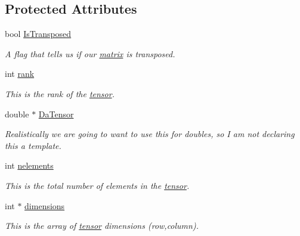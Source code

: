 \subsection*{Protected Attributes}
\begin{DoxyCompactItemize}
\item 
bool \hyperlink{classJKBuilder_1_1matrix_a77fa48e57c519482de2ec7ec182b16ef}{IsTransposed}
\begin{DoxyCompactList}\small\item\em A flag that tells us if our \hyperlink{classJKBuilder_1_1matrix}{matrix} is transposed. \item\end{DoxyCompactList}\item 
int \hyperlink{classJKBuilder_1_1tensor_a6cfd95afd0afebd625b889fb6e58371c}{rank}
\begin{DoxyCompactList}\small\item\em This is the rank of the \hyperlink{classJKBuilder_1_1tensor}{tensor}. \item\end{DoxyCompactList}\item 
double $\ast$ \hyperlink{classJKBuilder_1_1tensor_a91f7b1e58c0e5d1a49ddb8b80ab7790e}{DaTensor}
\begin{DoxyCompactList}\small\item\em Realistically we are going to want to use this for doubles, so I am not declaring this a template. \item\end{DoxyCompactList}\item 
int \hyperlink{classJKBuilder_1_1tensor_a23ae6a00bed19d2ad34d439636e797da}{nelements}
\begin{DoxyCompactList}\small\item\em This is the total number of elements in the \hyperlink{classJKBuilder_1_1tensor}{tensor}. \item\end{DoxyCompactList}\item 
int $\ast$ \hyperlink{classJKBuilder_1_1tensor_a2ce1e6e0782ddee097f2c4aa2663d3e9}{dimensions}
\begin{DoxyCompactList}\small\item\em This is the array of \hyperlink{classJKBuilder_1_1tensor}{tensor} dimensions (row,column). \item\end{DoxyCompactList}\end{DoxyCompactItemize}
